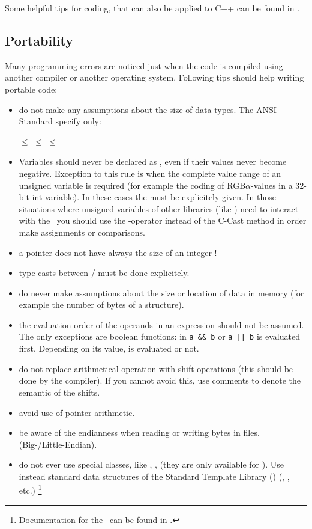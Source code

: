 Some helpful tips for coding, that can also be applied to C++ can be found in
\cite{java}.

\subsection{Portability}

Many programming errors are noticed just when the code is compiled using
another compiler or another operating system.  Following tips should help
writing portable code:

\begin{itemize}
\item do not make any assumptions about the size of data types.  The
  ANSI-Standard specify only:
\begin{center}
   $\leq$  $\leq$ 
  $\leq$ 
\end{center}
\item Variables should never be declared as , even if
  their values never become negative.  Exception to this rule is when the
  complete value range of an unsigned variable is required (for example the
  coding of RGB$\alpha$-values in a 32-bit int variable).  In these cases the
   must be explicitely given.  In those situations where
  unsigned variables of other libraries (like ) need to interact
  with the \ltilib\, you should use the \staticcast-operator instead of the
  C-Cast method in order make assignments or comparisons.
\item a pointer does not have always the size of an integer !
\item type casts between / must be done
  explicitely.
\item do never make assumptions about the size or location of data in memory
  (for example the number of bytes of a structure).
\item the evaluation order of the operands in an expression should not be
  assumed.  The only exceptions are boolean functions:  in \verb+a && b+ or
  \verb+a || b+  is evaluated first.  Depending on its value, 
  is evaluated or not.
\item do not replace arithmetical operation with shift operations (this should
  be done by the compiler).  If you cannot avoid this, use comments to denote
  the semantic of the shifts.
\item avoid use of pointer arithmetic.
\item be aware of the endianness when reading or writing bytes in files.
(Big-/Little-Endian).
\item do not ever use  special classes, like ,
  ,  (they are only available for \visualc).  Use
  instead standard data structures of the Standard Template Library (\stl)
  (, , etc.)%
\footnote{Documentation for the \stl\ can be found in \cite{stl}.}
\end{itemize}

